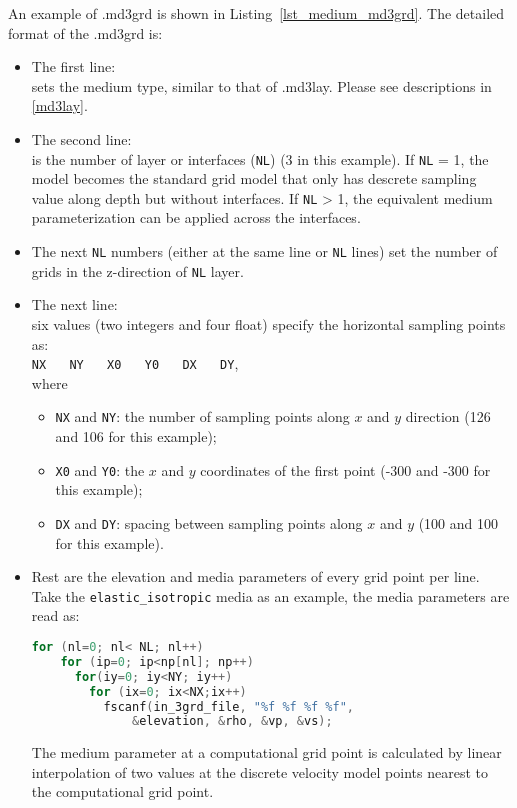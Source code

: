 An example of .md3grd is shown in Listing~\ref{lst_medium_md3grd}. %
The detailed format of the .md3grd is:
\begin{itemize}
  \item The first line: \\
    sets the medium type, similar to that of .md3lay. 
     Please see descriptions in \ref{md3lay}.

   \item The second line: \\
     is the number of layer or interfaces (\texttt{NL}) (3 in this example).
     If \texttt{NL} = 1, the model becomes the standard grid model that
     only has descrete sampling value along depth but without interfaces.
     If \texttt{NL} > 1, the equivalent medium parameterization can be applied across the interfaces.

   \item The next \texttt{NL} numbers (either at the same line or \texttt{NL} lines)
     set the number of grids in the z-direction of \texttt{NL} layer.
  
   \item The next line: \\
      six values (two integers and four float) specify the horizontal sampling points as:\\
      \texttt{NX} ~~ \texttt{NY} ~~ \texttt{X0} ~~ \texttt{Y0} ~~ \texttt{DX} ~~ \texttt{DY}, \\
      where
      \begin{itemize}
        \item \texttt{NX} and \texttt{NY}:
            the number of sampling points along $x$ and $y$ direction (126 and 106 for this example);
        \item \texttt{X0} and \texttt{Y0}: 
          the $x$ and $y$ coordinates of the first point (-300 and -300 for this example);
        \item \texttt{DX} and \texttt{DY}:
          spacing between sampling points along $x$ and $y$ (100 and 100 for this example).
      \end{itemize}

  \item Rest are the elevation and media parameters of every grid point per line.
    Take the \texttt{elastic\_isotropic} media as an example,
    the media parameters are read as:
  \begin{lstlisting}[language = C]
  for (nl=0; nl< NL; nl++)
    for (ip=0; ip<np[nl]; np++)
      for(iy=0; iy<NY; iy++)
        for (ix=0; ix<NX;ix++)
          fscanf(in_3grd_file, "%f %f %f %f", 
              &elevation, &rho, &vp, &vs);
  \end{lstlisting}
  The medium parameter at a computational grid point is calculated
    by linear interpolation of two values at the discrete velocity model points
    nearest to the computational grid point.

\end{itemize}


